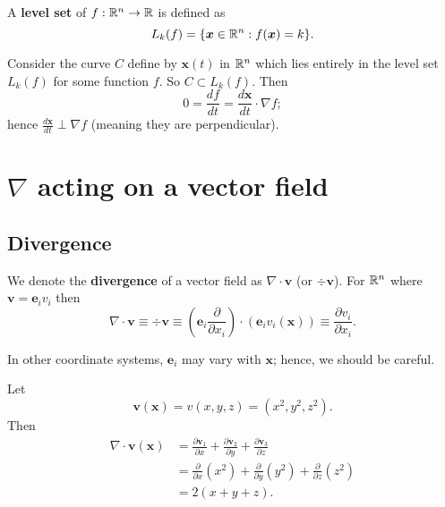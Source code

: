 
\begin{definition}
    A \textbf{level set} of $f: \mathbb{R}^n \to \mathbb{R}$ is defined as
    \[ L_k(f) = \{ \bm x \in \mathbb{R}^n : f(\bm x) = k \}. \]
\end{definition}

\begin{remark}
    Consider the curve $C$ define by $\bm x(t)$ in $\mathbb{R}^n$ which lies entirely in the level set $L_k(f)$ for some function $f$. So $C \subset L_k(f)$. Then
    \[ 0 = \frac{df}{dt} = \frac{d \bm x}{dt} \cdot \nabla f; \]
    hence $\frac{d\bm x}{dt} \perp \nabla f$ (meaning they are perpendicular).
\end{remark}

\chapter{$\nabla$ acting on a vector field}

\section{Divergence}

\begin{definition}[Divergence]
    We denote the \textbf{divergence} of a vector field as $\nabla \cdot \bm v$ (or $\div{\bm v}$). For $\mathbb{R}^n$ where $\bm v = \bm e_i v_i$ then
    \[ \nabla \cdot \bm v \equiv \div{\bm v} \equiv \left(\bm e_i \frac{\partial}{\partial x_i}\right) \cdot \left(\bm e_i v_i(\bm x)\right) \equiv \frac{\partial v_i}{\partial x_i}. \]
\end{definition}

\begin{remark}
    In other coordinate systems, $\bm e_i$ may vary with $\bm x$; hence, we should be careful.
\end{remark}

\begin{example}
    Let
    \[ \bm v(\bm x) = v(x, y, z) = (x^2, y^2, z^2). \]
    Then
    \begin{align*}
        \nabla \cdot \bm v(\bm x) &= \frac{\partial \bm v_1}{\partial x} + \frac{\partial \bm v_2}{\partial y} + \frac{\partial \bm v_3}{\partial z} \\
                                  &= \frac{\partial}{\partial x} (x^2) + \frac{\partial}{\partial y} (y^2) + \frac{\partial}{\partial z} (z^2) \\
                                  &= 2(x + y + z).
    \end{align*}
\end{example}

